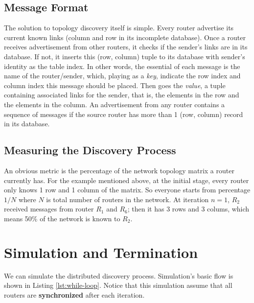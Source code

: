 \documentclass[12pt]{article}  %
\theoremstyle{definition}
\theoremstyle{remark}
\begin{document}
\subsection{Message Format}
The solution to topology discovery itself is simple.
Every router advertise its current known links (column and row in its incomplete database).
Once a router receives advertisement from other routers, it checks if the sender's links are in its database.
If not, it inserts this (row, column) tuple to its database with sender's identity as the table index.
In other words, the essential of each message is the name of the router/sender, which, playing as a \textit{key}, indicate the row index and column index this message should be placed.
Then goes the \textit{value}, a tuple containing associated links for the sender, that is, the elements in the row and the elements in the column.
An advertisement from any router contains a sequence of messages if the source router has more than 1 (row, column) record in its database.

\subsection{Measuring the Discovery Process}
An obvious metric is the percentage of the network topology matrix a router currently has.
For the example mentioned above, at the initial stage, every router only knows 1 row and 1 column of the matrix.
So everyone starts from percentage $1/N$ where $N$ is total number of routers in the network.
At iteration $n=1$, $R_2$ received messages from router $R_1$ and $R_6$; then it has 3 rows and 3 colums, which means 50\% of the network is known to $R_2$.

\section{Simulation and Termination}
We can simulate the distributed discovery process.
Simulation's basic flow is shown in Listing \ref{lst:while-loop}.
Notice that this simulation assume that all routers are \textbf{synchronized} after each iteration.
\end{document}
